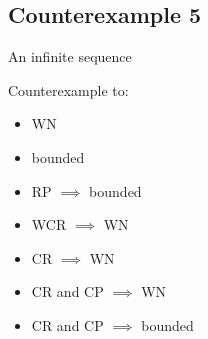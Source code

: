 \documentclass{scrartcl}
\begin{document}
\subsection*{Counterexample 5}
An infinite sequence
  \begin{center}
    \end{center}
Counterexample to:
\begin{itemize}
  \item WN
  \item bounded
  \item RP $\implies$ bounded
  \item WCR $\implies$ WN
  \item CR $\implies$ WN
  \item CR and CP $\implies$ WN
  \item CR and CP $\implies$ bounded
\end{itemize}
\end{document}
